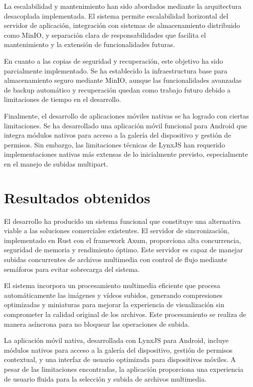 La escalabilidad y mantenimiento han sido abordados mediante la arquitectura desacoplada implementada. El sistema permite escalabilidad horizontal del servidor de aplicación, integración con sistemas de almacenamiento distribuido como MinIO, y separación clara de responsabilidades que facilita el mantenimiento y la extensión de funcionalidades futuras.

En cuanto a las copias de seguridad y recuperación, este objetivo ha sido parcialmente implementado. Se ha establecido la infraestructura base para almacenamiento seguro mediante MinIO, aunque las funcionalidades avanzadas de backup automático y recuperación quedan como trabajo futuro debido a limitaciones de tiempo en el desarrollo.

Finalmente, el desarrollo de aplicaciones móviles nativas se ha logrado con ciertas limitaciones. Se ha desarrollado una aplicación móvil funcional para Android que integra módulos nativos para acceso a la galería del dispositivo y gestión de permisos. Sin embargo, las limitaciones técnicas de LynxJS han requerido implementaciones nativas más extensas de lo inicialmente previsto, especialmente en el manejo de subidas multipart.

\section{Resultados obtenidos}

El desarrollo ha producido un sistema funcional que constituye una alternativa viable a las soluciones comerciales existentes. El servidor de sincronización, implementado en Rust con el framework Axum, proporciona alta concurrencia, seguridad de memoria y rendimiento óptimo. Este servidor es capaz de manejar subidas concurrentes de archivos multimedia con control de flujo mediante semáforos para evitar sobrecarga del sistema.

El sistema incorpora un procesamiento multimedia eficiente que procesa automáticamente las imágenes y vídeos subidos, generando compresiones optimizadas y miniaturas para mejorar la experiencia de visualización sin comprometer la calidad original de los archivos. Este procesamiento se realiza de manera asíncrona para no bloquear las operaciones de subida.

La aplicación móvil nativa, desarrollada con LynxJS para Android, incluye módulos nativos para acceso a la galería del dispositivo, gestión de permisos contextual, y una interfaz de usuario optimizada para dispositivos móviles. A pesar de las limitaciones encontradas, la aplicación proporciona una experiencia de usuario fluida para la selección y subida de archivos multimedia.

